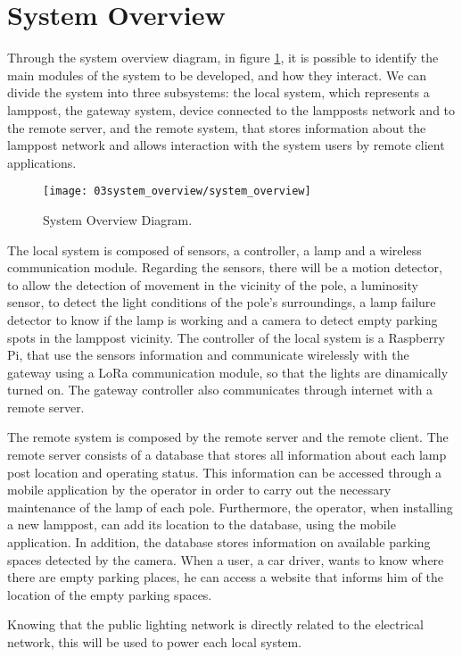 \section{System Overview}
Through the system overview diagram, in figure \ref{fig:system_overview}, it is possible to identify the main modules of the system to be developed, and how they interact. We can divide the system into three subsystems: the local system, which represents a lamppost, the gateway system, device connected to the lampposts network and to the remote server, and the remote system, that stores information about the lamppost network and allows interaction with the system users by remote client applications.

\begin{figure}[H]
	\centering
	\texttt{[image: 03system\_overview/system\_overview]}
	\caption{System Overview Diagram.}
	\label{fig:system_overview}
\end{figure}

The local system is composed of sensors, a controller, a lamp and a wireless communication module. Regarding the sensors, there will be a motion detector, to allow the detection of movement in the vicinity of the pole, a luminosity sensor, to detect the light conditions of the pole’s surroundings, a lamp failure detector to know if the lamp is working and a camera to detect empty parking spots in the lamppost vicinity. The controller of the local system is a Raspberry Pi, that use the sensors information and communicate wirelessly with the gateway using a LoRa communication module, so that the lights are dinamically turned on. The gateway controller also communicates through internet with a remote server.

The remote system is composed by the remote server and the remote client. The remote server consists of a database that stores all information about each lamp post location and operating status. This information can be accessed through a mobile application by the operator in order to carry out the necessary maintenance of the lamp of each pole. Furthermore, the operator, when installing a new lamppost, can add its location to the database, using the mobile application. In addition, the database stores information on available parking spaces detected by the camera. When a user, a car driver, wants to know where there are empty parking places, he can access a website that informs him of the location of the empty parking spaces.

Knowing that the public lighting network is directly related to the electrical network, this will be used to power each local system.

